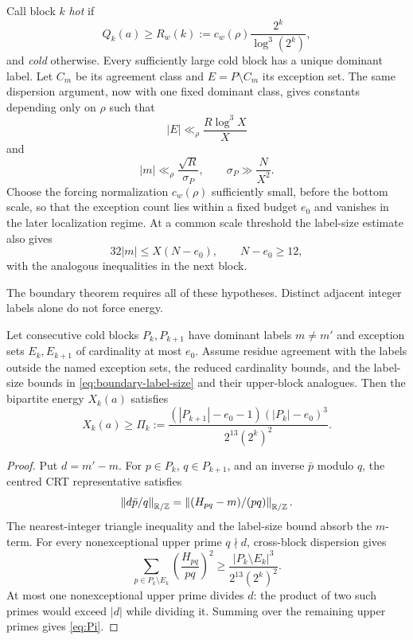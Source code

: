 Call block $k$ \emph{hot} if
\begin{equation}\label{eq:forcing-floor}
 Q_k(a)\ge R_w(k):=c_w(\rho)\frac{2^k}{\log^3(2^k)},
\end{equation}
and \emph{cold} otherwise.  Every sufficiently large cold block has a unique
dominant label.  Let $C_m$ be its agreement class and $E=P\setminus C_m$ its
exception set.  The same dispersion argument, now with one fixed dominant
class, gives constants depending only on $\rho$ such that
\begin{equation}\label{eq:exception-count-symbolic}
 |E|\ll_\rho \frac{R\log^3X}{X}
\end{equation}
and
\begin{equation}\label{eq:label-bound}
 |m|\ll_\rho\frac{\sqrt R}{\sigma_P},
 \qquad
 \sigma_P\gg\frac{N}{X^2}.
\end{equation}
Choose the forcing normalization $c_w(\rho)$ sufficiently small, before the
bottom scale, so that the exception count lies within a fixed budget $e_0$ and
vanishes in the later localization regime.  At a common scale threshold the
label-size estimate also gives
\begin{equation}\label{eq:boundary-label-size}
 32|m|\le X(N-e_0),
 \qquad N-e_0\ge12,
\end{equation}
with the analogous inequalities in the next block.

The boundary theorem requires all of these hypotheses.  Distinct adjacent
integer labels alone do not force energy.

\begin{proposition}
\label{prop:boundary-penalty}
Let consecutive cold blocks $P_k,P_{k+1}$ have dominant labels $m\ne m'$ and
exception sets $E_k,E_{k+1}$ of cardinality at most $e_0$.  Assume residue
agreement with the labels outside the named exception sets, the reduced
cardinality bounds, and the label-size bounds in
\eqref{eq:boundary-label-size} and their upper-block analogues.  Then the
bipartite energy $X_k(a)$ satisfies
\begin{equation}\label{eq:Pi}
 X_k(a)\ge\Pi_k:=
 \frac{(|P_{k+1}|-e_0-1)(|P_k|-e_0)^3}
      {2^{13}(2^k)^2}.
\end{equation}
\end{proposition}
\begin{proof}
Put $d=m'-m$.  For $p\in P_k$, $q\in P_{k+1}$, and an inverse $\bar p$ modulo
$q$, the centred CRT representative satisfies
\[
 \left\lVert d\bar p/q\right\rVert_{\mathbb R/\mathbb Z}=\left\lVert (H_{pq}-m)/(pq)\right\rVert_{\mathbb R/\mathbb Z}.
\]
The nearest-integer triangle inequality and the label-size bound absorb the
$m$-term.  For every nonexceptional upper prime $q\nmid d$, cross-block
dispersion gives
\[
 \sum_{p\in P_k\setminus E_k}
 \left(\frac{H_{pq}}{pq}\right)^2
 \ge\frac{|P_k\setminus E_k|^3}{2^{13}(2^k)^2}.
\]
At most one nonexceptional upper prime divides $d$: the product of two such
primes would exceed $|d|$ while dividing it.  Summing over the remaining upper
primes gives \eqref{eq:Pi}.
\end{proof}

